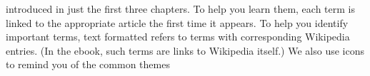 introduced in just the first three chapters.
\ifhtmloutput
  To help you learn them,
  each term is linked to the appropriate  article the first
time it appears.
\else
To help you identify important terms, text formatted
\textsf{\slshape{}}
refers to  terms with corresponding Wikipedia entries.  (In the
ebook, such terms are links to Wikipedia itself.)
\fi
We also use icons to remind you of the common themes